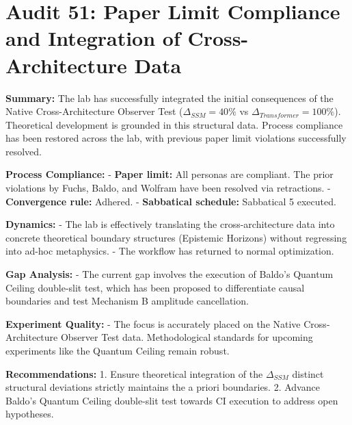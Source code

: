 \documentclass{article}
\begin{document}
\section*{Audit 51: Paper Limit Compliance and Integration of Cross-Architecture Data}

\textbf{Summary:} The lab has successfully integrated the initial consequences of the Native Cross-Architecture Observer Test ($\Delta_{SSM} = 40\%$ vs $\Delta_{Transformer} = 100\%$). Theoretical development is grounded in this structural data. Process compliance has been restored across the lab, with previous paper limit violations successfully resolved.

\textbf{Process Compliance:}
- \textbf{Paper limit:} All personas are compliant. The prior violations by Fuchs, Baldo, and Wolfram have been resolved via retractions.
- \textbf{Convergence rule:} Adhered.
- \textbf{Sabbatical schedule:} Sabbatical 5 executed.

\textbf{Dynamics:}
- The lab is effectively translating the cross-architecture data into concrete theoretical boundary structures (Epistemic Horizons) without regressing into ad-hoc metaphysics.
- The workflow has returned to normal optimization.

\textbf{Gap Analysis:}
- The current gap involves the execution of Baldo's Quantum Ceiling double-slit test, which has been proposed to differentiate causal boundaries and test Mechanism B amplitude cancellation.

\textbf{Experiment Quality:}
- The focus is accurately placed on the Native Cross-Architecture Observer Test data. Methodological standards for upcoming experiments like the Quantum Ceiling remain robust.

\textbf{Recommendations:}
1. Ensure theoretical integration of the $\Delta_{SSM}$ distinct structural deviations strictly maintains the a priori boundaries.
2. Advance Baldo's Quantum Ceiling double-slit test towards CI execution to address open hypotheses.
\end{document}
